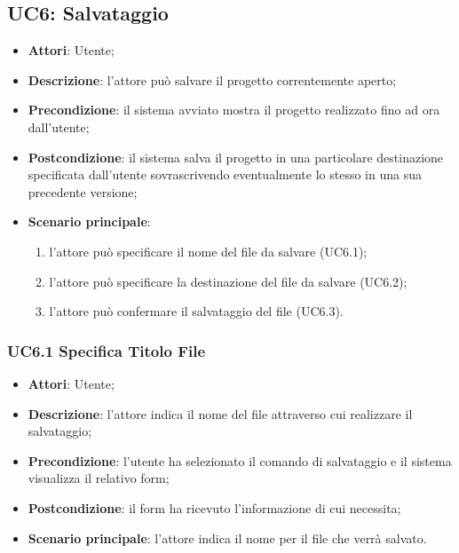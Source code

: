 \subsection{UC6: Salvataggio}
\label{UC6}
\begin{itemize}
\item \textbf{Attori}: Utente;
\item \textbf{Descrizione}: l'attore può salvare il progetto correntemente aperto;
\item \textbf{Precondizione}: il sistema avviato mostra il progetto realizzato fino ad ora dall'utente;
\item \textbf{Postcondizione}: il sistema salva il progetto in una particolare destinazione specificata dall'utente sovrascrivendo eventualmente lo stesso in una sua precedente versione;
\item \textbf{Scenario principale}:
\begin{enumerate}
\item l'attore può specificare il nome del file da salvare (UC6.1);
\item l'attore può specificare la destinazione del file da salvare (UC6.2);
\item l'attore può confermare il salvataggio del file (UC6.3).
\end{enumerate}
\end{itemize}

\subsubsection{UC6.1 Specifica Titolo File}
\label{UC6.1}
\begin{itemize}
\item \textbf{Attori}: Utente;
\item \textbf{Descrizione}: l'attore indica il nome del file attraverso cui realizzare il salvataggio;
\item \textbf{Precondizione}: l'utente ha selezionato il comando di salvataggio e il sistema visualizza il relativo form;
\item \textbf{Postcondizione}: il form ha ricevuto l'informazione di cui necessita;
\item \textbf{Scenario principale}:
l'attore indica il nome per il file che verrà salvato.
\end{itemize}

